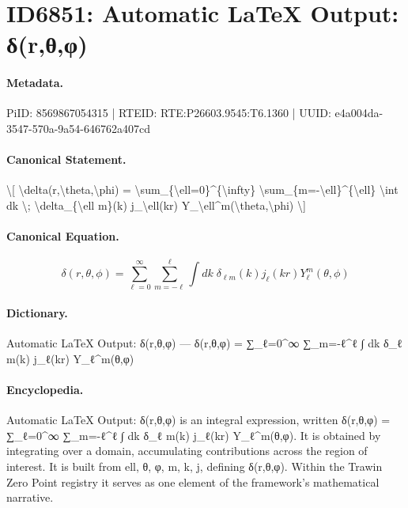 \section*{ID6851: Automatic LaTeX Output: δ(r,θ,φ)}
\paragraph{Metadata.}
PiID: 8569867054315 | RTEID: RTE:P26603.9545:T6.1360 | UUID: e4a004da-3547-570a-9a54-646762a407cd

\paragraph{Canonical Statement.}
\textbackslash{}[ \textbackslash{}delta(r,\textbackslash{}theta,\textbackslash{}phi) = \textbackslash{}sum\_\{\textbackslash{}ell=0\}\textasciicircum{}\{\textbackslash{}infty\} \textbackslash{}sum\_\{m=-\textbackslash{}ell\}\textasciicircum{}\{\textbackslash{}ell\} \textbackslash{}int dk \textbackslash{}; \textbackslash{}delta\_\{\textbackslash{}ell m\}(k) j\_\textbackslash{}ell(kr) Y\_\textbackslash{}ell\textasciicircum{}m(\textbackslash{}theta,\textbackslash{}phi) \textbackslash{}]

\paragraph{Canonical Equation.}
\[
\delta(r,\theta,\phi) = \sum_{\ell=0}^{\infty} \sum_{m=-\ell}^{\ell} \int dk \; \delta_{\ell m}(k) j_\ell(kr) Y_\ell^m(\theta,\phi)
\]

\paragraph{Dictionary.}
Automatic LaTeX Output: δ(r,θ,φ) — δ(r,θ,φ) = ∑\_ℓ=0\textasciicircum{}∞ ∑\_m=-ℓ\textasciicircum{}ℓ ∫ dk δ\_ℓ m(k) j\_ℓ(kr) Y\_ℓ\textasciicircum{}m(θ,φ)

\paragraph{Encyclopedia.}
Automatic LaTeX Output: δ(r,θ,φ) is an integral expression, written δ(r,θ,φ) = ∑\_ℓ=0\textasciicircum{}∞ ∑\_m=-ℓ\textasciicircum{}ℓ ∫ dk δ\_ℓ m(k) j\_ℓ(kr) Y\_ℓ\textasciicircum{}m(θ,φ). It is obtained by integrating over a domain, accumulating contributions across the region of interest. It is built from ell, θ, φ, m, k, j, defining δ(r,θ,φ). Within the Trawin Zero Point registry it serves as one element of the framework's mathematical narrative.
